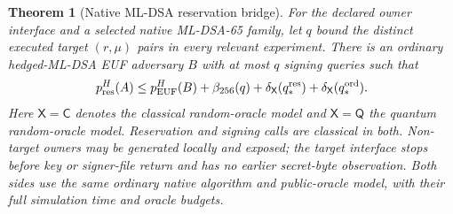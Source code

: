\documentclass[pdflatex]{sn-jnl}
\theoremstyle{thmstyleone}
\newtheorem{theorem}{Theorem}[section]
\theoremstyle{thmstylethree}
\theoremstyle{thmstyletwo}
\begin{document}
\begin{theorem}[Native ML-DSA reservation bridge]
\label{thm:native-mldsa-reservation-bridge}
For the declared owner interface and a selected native ML-DSA-65 family,
let $q$ bound the distinct executed target $(r,\mu)$ pairs in every
relevant experiment. There is an ordinary hedged-ML-DSA EUF adversary $B$ with at most $q$
signing queries such that
\begin{equation}
 p_{\rm res}^{H}(A)
 \le p_{\rm EUF}^{H}(B)+\beta_{256}(q)
       +\delta_{\mathsf X}(q_*^{\rm res})
       +\delta_{\mathsf X}(q_*^{\rm ord}).
 \label{eq:native-mldsa-reservation-bridge}
\end{equation}
Here $\mathsf X=\mathsf C$ denotes the classical random-oracle model and
$\mathsf X=\mathsf Q$ the quantum random-oracle model. Reservation and
signing calls are classical in both. Non-target owners may be generated
locally and exposed; the target interface stops before key or signer-file
return and has no earlier secret-byte observation. Both sides use the
same ordinary native algorithm and public-oracle model, with their full
simulation time and oracle budgets.
\end{theorem}
\end{document}
